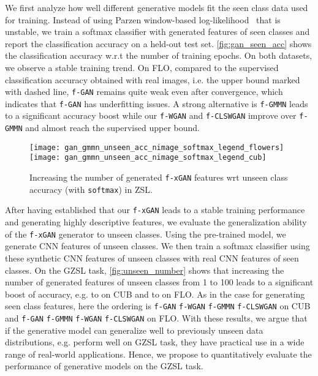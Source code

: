 \documentclass[10pt,twocolumn,letterpaper]{article}
\newcommand{\myparagraph}[1]{\vspace{6pt}\noindent{\bf #1}}
\def\mthd{\texttt{f-xGAN}\xspace}
\begin{document}
\myparagraph{Stability and Generalization.} We first analyze how well different generative models fit the seen class data used for training. Instead of using Parzen window-based log-likelihood~\cite{GPMXWDOCB14} that is unstable, we train a softmax classifier with generated features of seen classes and report the classification accuracy on a held-out test set. \autoref{fig:gan_seen_acc} shows the classification accuracy w.r.t the number of training epochs. On both datasets, we observe a stable training trend. On FLO, compared to the supervised classification accuracy obtained with real images, i.e. the upper bound marked with dashed line, \texttt{f-GAN} remains quite weak even after convergence, which indicates that \texttt{f-GAN} has underfitting issues. A strong alternative is \texttt{f-GMMN} leads to a significant accuracy boost while our \texttt{f-WGAN} and \texttt{f-CLSWGAN} improve over \texttt{f-GMMN} and almost reach the supervised upper bound. 

\begin{figure}[t]
	\centering
            \texttt{[image: gan\_gmmn\_unseen\_acc\_nimage\_softmax\_legend\_flowers]}
		\texttt{[image: gan\_gmmn\_unseen\_acc\_nimage\_softmax\_legend\_cub]}
\caption{Increasing the number of generated \mthd features wrt unseen class accuracy (with \texttt{softmax}) in ZSL.}
	\label{fig:unseen_number}
\end{figure}

After having established that our \mthd leads to a stable training performance and generating highly descriptive features, 
we evaluate the generalization ability of the \mthd generator to unseen classes. Using the pre-trained model, we generate CNN features of unseen classes. We then train a softmax classifier using these synthetic CNN features of unseen classes with real CNN features of seen classes. On the GZSL task, \autoref{fig:unseen_number} shows that increasing the number of generated features of unseen classes from 1 to 100 leads to a significant boost of accuracy, e.g.  to  on CUB and  to  on FLO. As in the case for generating seen class features, here the ordering is \texttt{f-GAN}  \texttt{f-WGAN}  \texttt{f-GMMN}  \texttt{f-CLSWGAN} on CUB and \texttt{f-GAN}  \texttt{f-GMMN}  \texttt{f-WGAN}  \texttt{f-CLSWGAN} on FLO. With these results, we argue that if the generative model can generalize well to previously unseen data distributions, e.g. perform well on GZSL task, they have practical use in a wide range of real-world applications. Hence, we propose to quantitatively evaluate the performance of generative models on the GZSL task. 
\end{document}
